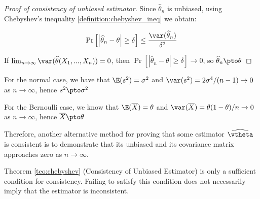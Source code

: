 \documentclass[english,12pt]{book}\usepackage[]{graphicx}\usepackage[]{xcolor}
\begin{document}
\begin{proof}[Proof of consistency of unbiased estimator]
  Since $\widehat{\theta}_n$ is unbiased, using Chebyshev's inequality \ref{definition:chebyshev_ineq} we obtain:
  
  \begin{equation*}
    \Pr\left[\left| \widehat{\theta}_n - \theta\right|\geq \delta \right]\leq \frac{\var(\widehat{\theta}_n)}{\delta ^2}
  \end{equation*}
  
  If $\lim_{n\to\infty}\var(\widehat{\theta}(X_1,...,X_n)) = 0$, then $\Pr\left[\left| \widehat{\theta}_n - \theta\right|\geq \delta \right]\to 0$, so $\widehat{\theta}_n\pto \theta$
\end{proof}

\begin{example}
For the normal case, we have that $\E(s^2) = \sigma^2$ and $\var(s^2) = 2\sigma^4 / (n - 1)\to 0$ as $n\to \infty$, hence $s^2\pto \sigma^2$
\end{example}


\begin{example}
For the Bernoulli case, we know that $\E(\overline{X}) = \theta$ and $\var(\overline{X}) = \theta (1- \theta)/ n \to 0$ as $n\to \infty$, hence $\overline{X}\pto \theta$
\end{example}

Therefore, another alternative method for proving that some estimator $\widehat{\vtheta}$ is consistent is to demonstrate that its unbiased and its covariance matrix approaches zero as $n\to\infty$.

\begin{remark}
Theorem \ref{teo:chebyshev} (Consistency of Unbiased Estimator) is only a sufficient condition for consistency. Failing to satisfy this condition does not necessarily imply that the estimator is inconsistent. 
\end{remark}

\end{document}
